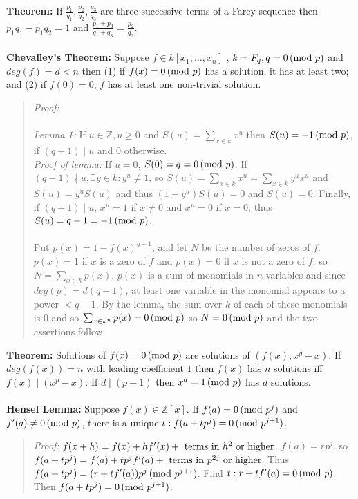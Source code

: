{\bf Theorem:} If 
$ {\frac {p_1} {q_1}}, {\frac {p_2} {q_2}}, {\frac {p_3} {q_3}}$ are three successive terms
of a Farey sequence then $p_1 q_1 - p_1 q_2 =1$ and 
${\frac {p_1 + p_3} {q_1 + q_3}}= {\frac {p_2} {q_2}}$.
\\
\\
{\bf Chevalley's Theorem:} Suppose $f \in k[x_1, \ldots, x_n]$ , $k= F_q, q=0 \thinspace \textnormal{(mod } p \textnormal{)}$ and
$deg(f)=d<n$
then (1) if $f(x)= 0 \thinspace \textnormal{(mod } p \textnormal{)}$ has a solution, it has at least two; and (2) if $f(0)=0$,
$f$ has at least one non-trivial solution.
\begin{quote}
\emph{Proof:}
\\
\\
\emph{Lemma 1:}  If $u \in {\mathbb Z}, u \geq 0$ and $S(u)= \sum_{x \in k} x^u$ then $S(u)= -1 \thinspace \textnormal{(mod } p \textnormal{)}$, 
if $(q-1) \mid u$ and $0$ otherwise.
\\
\emph{Proof of lemma:} If $u=0$, $S(0) = q = 0 \thinspace \textnormal{(mod } p \textnormal{)}$.  If $(q-1) \nmid u, \exists y \in k: y^u \neq 1$, so
$S(u)= \sum_{x \in k} x^u = \sum_{x \in k} y^u x^u$ and $S(u)= y^u S(u)$ and thus $(1-y^u)S(u)= 0$ and $S(u)= 0$.
Finally, if $(q-1) \mid u$, $x^u = 1$ if $x \neq 0$ and $x^u= 0$ if $x=0$; thus $S(u)= q-1 = -1 \thinspace \textnormal{(mod } p \textnormal{)}$.
\\
\\
Put $p(x)= 1-f(x)^{q-1}$, and let $N$ be the number of zeros of $f$.
$p(x)= 1$ if $x$ is a zero of $f$ and $p(x)= 0$ if $x$ is not a zero of $f$, so $N= \sum_{x \in k} p(x) $.
$p(x)$ is a sum of monomials in $n$ variables and since $deg(p)= d(q-1)$, at least one variable in the monomial appears
to a power $<q-1$.   
By the lemma, the sum over $k$ of each of these monomials is $0$ and so $\sum_{x \in k^n} p(x)= 0 \thinspace \textnormal{(mod } p \textnormal{)}$ so
$N= 0 \thinspace \textnormal{(mod } p \textnormal{)}$ and the two assertions follow.
\end{quote}
{\bf Theorem:}
Solutions of $f(x)= 0 \thinspace \textnormal{(mod } p \textnormal{)}$ are solutions of $(f(x), x^p-x)$.
If $deg(f(x)) = n$ with leading coefficient $1$ then $f(x)$ has $n$ solutions
iff $f(x) \mid (x^p - x)$.  If $d \mid (p-1)$ then $x^d = 1 \thinspace \textnormal{(mod } p \textnormal{)}$ has $d$ solutions.
\\
\\
{\bf Hensel Lemma:}  Suppose $f(x) \in {\mathbb Z} [x]$.  If $f(a) = 0 \thinspace \textnormal{(mod } p^j \textnormal{)}$ and
$f'(a) \ne 0 \thinspace \textnormal{(mod } p \textnormal{)}$, there is a unique $t: f(a+tp^j)= 0 \thinspace \textnormal{(mod } p^{j+1} \textnormal{)}$.
\begin{quote}
\emph{Proof:} 
$f(x+h)= f(x)+ h f'(x)+ \textnormal{ terms in } h^2 \textnormal{ or higher}$.  $f(a)= rp^j$, so
$f(a+tp^j)= f(a)+ tp^j f'(a) + \textnormal{ terms in } p^{2j} \textnormal{ or higher}$.  Thus
$f(a+t p^j)= (r+t f'(a)) p^j \thinspace \textnormal{(mod } p^{j+1} \textnormal{)}$.   Find $t: r+t f'(a) = 0 \thinspace \textnormal{(mod } p \textnormal{)}$.  Then
$f(a+tp^j)= 0 \thinspace \textnormal{(mod } p^{j+1} \textnormal{)}$.
\end{quote}
